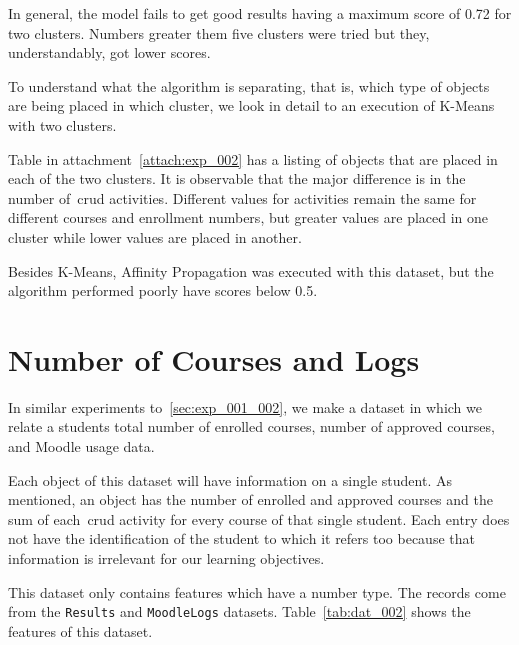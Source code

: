 In general, the model fails to get good results having a maximum score of 0.72
for two clusters. Numbers greater them five clusters were tried but they,
understandably, got lower scores.

To understand what the algorithm is separating, that is, which type of objects
are being placed in which cluster, we look in detail to an execution of K-Means
with two clusters.

Table in attachment~\ref{attach:exp_002} has a listing of objects that are
placed in each of the two clusters. It is observable that the major difference
is in the number of~\gls{crud} activities. Different values for activities
remain the same for different courses and enrollment numbers, but greater
values are placed in one cluster while lower values are placed in another.

Besides K-Means, Affinity Propagation was executed with this dataset, but the
algorithm performed poorly have scores below 0.5.

\section{Number of Courses and Logs}
\label{sec:exp_003_004}

In similar experiments to~\ref{sec:exp_001_002}, we make a dataset in which we
relate a students total number of enrolled courses,  number of approved
courses, and Moodle usage data.

Each object of this dataset will have information on a single student. As
mentioned, an object has the number of enrolled and approved courses and the
sum of each~\gls{crud} activity for every course of that single student. Each
entry does not have the identification of the student to which it refers too
because that information is irrelevant for our learning objectives.

This dataset only contains features which have a number type. The records come
from the \texttt{Results} and \texttt{MoodleLogs} datasets.
Table~\ref{tab:dat_002} shows the features of this dataset.

